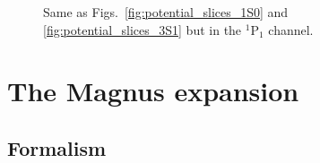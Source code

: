 \documentclass[preprintnumbers,floatfix,aps,prc,preprint,nofootinbib]{revtex4-1}
\begin{document}
%
\begin{figure}[H]
	\centering
	
	\caption{Same as Figs.~\ref{fig:potential_slices_1S0} and \ref{fig:potential_slices_3S1} but in the $^1$P$_1$ channel.}
	\label{potential_slices_1P1}
\end{figure}
%


\section{The Magnus expansion}
\label{sec:magnus_expansion}




\subsection{Formalism}
\label{sec:magnus_expansion_formalism}
\end{document}
